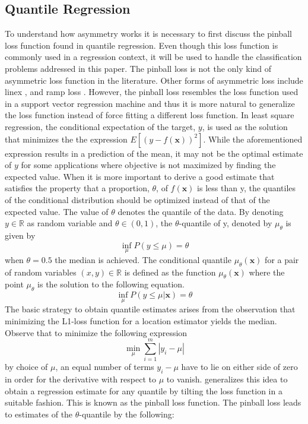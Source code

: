 \subsection{Quantile Regression}
To understand how asymmetry works it is necessary to first discuss the pinball loss function found in quantile regression. Even though this loss function is commonly used in a regression context, it will be used to handle the classification problems addressed in this paper. The pinball loss is not the only kind of asymmetric loss function in the literature. Other forms of asymmetric loss include linex \citep{Demetrescu07} \citep{Ohtani95}, and ramp loss \citep{Takeuchi06}. However, the pinball loss resembles the loss function used in a support vector regression machine and thus it is more natural to generalize the loss function instead of force fitting a different loss function. In least square regression, the conditional expectation of the target, $y$, is used as the solution that minimizes the the expression $E[(y-f(\mathbf{x}))^2]$. While the aforementioned expression results in a prediction of the mean, it may not be the optimal estimate of $y$ for some applications where objective is not maximized by finding the expected value. When it is more important to derive a good estimate that satisfies the property that a proportion, $\theta$, of $f(\mathbf{x})$ is less than y, the quantiles of the conditional distribution should be optimized instead of that of the expected value. The value of $\theta$ denotes the quantile of the data. By denoting $y \in \mathbb{R}$ as random variable and $\theta \in (0,1)$, the $\theta$-quantile of y, denoted by $\mu_{\theta}$ is given by
 \begin{equation}
 \inf_{\mu}P(y\leq \mu)=\theta
 \end{equation}
when $\theta = 0.5$ the median is achieved. The conditional quantile $\mu_{\theta}(\mathbf{x})$ for a pair of random variables $(x,y) \in \mathbb{R}$ is defined as the function $\mu_{\theta}(\mathbf{x}) $ where the point $\mu_{\theta}$ is the solution to the following equation.
 \begin{equation}
 \inf_{\mu}P(y\leq \mu|\mathbf{x})=\theta
 \end{equation}
The basic strategy to obtain quantile estimates arises from the observation that minimizing the L1-loss function for a location estimator yields the median. Observe that to minimize the following expression
\begin{equation}
\min_{\mu}\sum_{i=1}^{m}|y_i-\mu|
 \end{equation}
by choice of $\mu$, an equal number of terms $y_i-\mu$ have to lie on either side of zero in order for the derivative with respect to $\mu$ to vanish. \citet{Koenker01} generalizes this idea to obtain a regression estimate for any quantile by tilting the loss function in a suitable fashion. This is known as the pinball loss function. The pinball loss leads to estimates of the $\theta$-quantile by the following:

